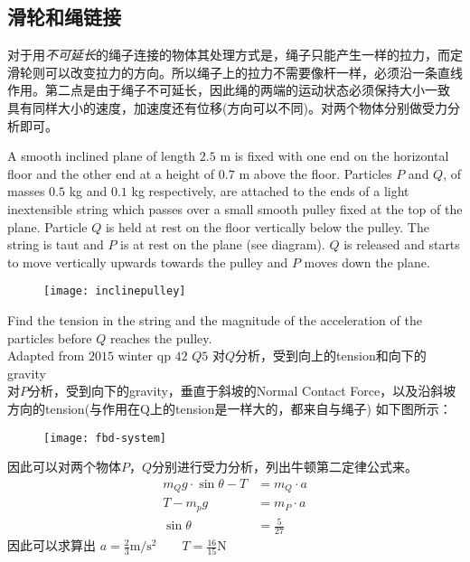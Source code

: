 \subsection*{滑轮和绳链接}
对于用\emph{不可延长}的绳子连接的物体其处理方式是，绳子只能产生一样的拉力，而定滑轮则可以改变拉力的方向。所以绳子上的拉力不需要像杆一样，必须沿一条直线作用。第二点是由于绳子不可延长，因此绳的两端的运动状态必须保持大小一致
具有同样大小的速度，加速度还有位移(方向可以不同)。对两个物体分别做受力分析即可。

\begin{ExampleBox}
A smooth inclined plane of length $2.5$ \si{\m} is ﬁxed with one end on the horizontal ﬂoor and the other end at a height of $0.7$ \si{\m} above the ﬂoor. Particles $P$ and $Q$, of masses $0.5$ \si{\kg} and $0.1$ \si{\kg} respectively, are attached to the ends of a light inextensible string which passes over a small smooth pulley ﬁxed at the top of the plane. Particle $Q$ is held at rest on the ﬂoor vertically below the pulley. The string is taut and $P$ is at rest on the plane (see diagram). $Q$ is released and starts to move vertically upwards towards the pulley and $P$ moves down the plane.
\begin{figure}[H]
\centering
\texttt{[image: inclinepulley]}
\end{figure}
Find the tension in the string and the magnitude of the acceleration of the particles before $Q$ reaches the pulley.\\
\makebox{}\hfill Adapted from $2015$ winter qp $42$ $Q5$
\tcblower
对$Q$分析，受到向上的tension和向下的gravity\\
对$P$分析，受到向下的gravity，垂直于斜坡的Normal Contact Force，以及沿斜坡方向的tension(与作用在Q上的tension是一样大的，都来自与绳子)
如下图所示：
\begin{figure}[H]
\centering
\texttt{[image: fbd-system]}
\end{figure}
因此可以对两个物体$P$，$Q$分别进行受力分析，列出牛顿第二定律公式来。
\begin{align*}
m_Qg\cdot \sin\theta -T &=m_Q\cdot a\\
T-m_pg &=m_P\cdot a\\
\sin\theta &=\frac{5}{27}
\end{align*}
因此可以求算出 $a=\frac{2}{3}\si{\m\per\square\s} \qquad T=\frac{16}{15} \si{\N}$
\end{ExampleBox}




